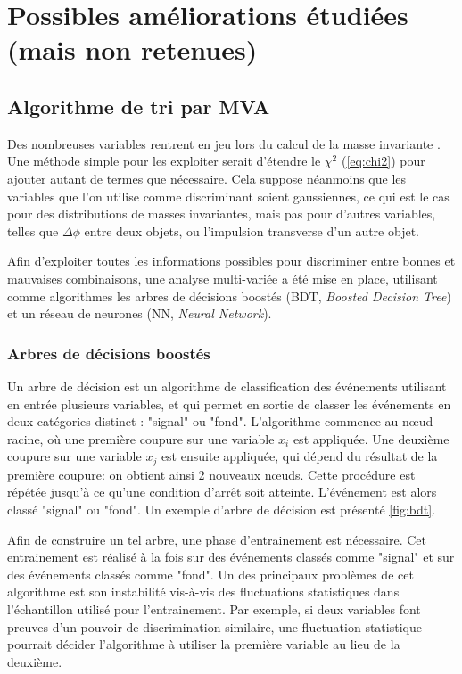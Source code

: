 \section{Possibles améliorations étudiées (mais non retenues)} \label{sec:reco_tests}

\subsection{Algorithme de tri par MVA} \label{sec:mva}

Des nombreuses variables rentrent en jeu lors du calcul de la masse invariante \ttbar. Une méthode simple pour les exploiter serait d'étendre le $\chi^2$ (\cref{eq:chi2}) pour ajouter autant de termes que nécessaire. Cela suppose néanmoins que les variables que l'on utilise comme discriminant soient gaussiennes, ce qui est le cas pour des distributions de masses invariantes, mais pas pour d'autres variables, telles que $\Delta \phi$ entre deux objets, ou l'impulsion transverse d'un autre objet.

Afin d'exploiter toutes les informations possibles pour discriminer entre bonnes et mauvaises combinaisons, une analyse multi-variée a été mise en place, utilisant comme algorithmes les arbres de décisions boostés (BDT, \emph{Boosted Decision Tree}) et un réseau de neurones (NN, \emph{Neural Network}).


\subsubsection{Arbres de décisions boostés}

Un arbre de décision est un algorithme de classification des événements utilisant en entrée plusieurs variables, et qui permet en sortie de classer les événements en deux catégories distinct : "signal" ou "fond". L'algorithme commence au nœud racine, où une première coupure sur une variable $x_i$ est appliquée. Une deuxième coupure sur une variable $x_j$ est ensuite appliquée, qui dépend du résultat de la première coupure: on obtient ainsi 2 nouveaux nœuds. Cette procédure est répétée jusqu'à ce qu'une condition d'arrêt soit atteinte. L'événement est alors classé "signal" ou "fond". Un exemple d'arbre de décision est présenté \cref{fig:bdt}.

Afin de construire un tel arbre, une phase d'entrainement est nécessaire. Cet entrainement est réalisé à la fois sur des événements classés comme "signal" et sur des événements classés comme "fond". Un des principaux problèmes de cet algorithme est son instabilité vis-à-vis des fluctuations statistiques dans l'échantillon utilisé pour l'entrainement. Par exemple, si deux variables font preuves d'un pouvoir de discrimination similaire, une fluctuation statistique pourrait décider l'algorithme à utiliser la première variable au lieu de la deuxième.

